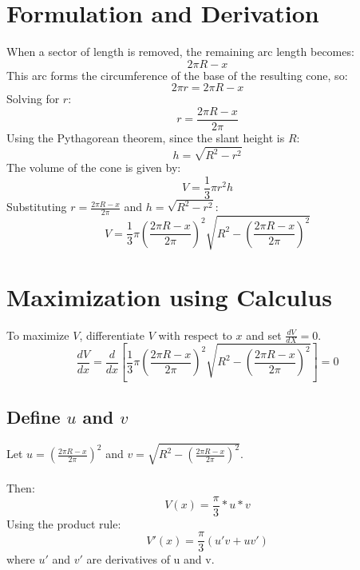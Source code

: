 \documentclass{article}
\begin{document}
\section{Formulation and Derivation}
When a sector of length is removed, the remaining arc length becomes:
\begin{equation}
    2\pi R - x
\end{equation}
This arc forms the circumference of the base of the resulting cone, so:
\begin{equation}
    2\pi r = 2\pi R - x
\end{equation}
Solving for \( r \):
\begin{equation}
    r = \frac{2\pi R - x}{2\pi}
\end{equation}
Using the Pythagorean theorem, since the slant height is \( R \):
\begin{equation}
    h = \sqrt{R^2 - r^2}
\end{equation}
The volume of the cone is given by:
\begin{equation}
    V = \frac{1}{3} \pi r^2 h
\end{equation}
Substituting \(r = \frac{2\pi R - x}{2\pi} \) and \(h = \sqrt{R^2 - r^2} \):
\begin{equation}
    V = \frac{1}{3} \pi \left(\frac{2\pi R - x}{2\pi}\right)^2 \sqrt{R^2 - \left(\frac{2\pi R - x}{2\pi}\right)^2}
\end{equation}


\section{Maximization using Calculus}
To maximize \( V \), differentiate \( V \) with respect to \( x \) and set \( \frac{dV}{dX} = 0 \).
\begin{equation}
    \frac{dV}{dx} = \frac{d}{dx} \left[\frac{1}{3} \pi \left(\frac{2\pi R - x}{2\pi}\right)^2 \sqrt{R^2 - \left(\frac{2\pi R - x}{2\pi}\right)^2} \right] = 0
\end{equation}
\subsection{Define \( u \) and \( v \)}
Let \( u = \left(\frac{2\pi R - x}{2\pi}\right)^2 \) and \( v = \sqrt{R^2 - \left(\frac{2\pi R - x}{2\pi}\right)^2} \). \\ \\
\noindent Then: 
\begin{equation}
    V(x) = \frac{\pi}{3} * u * v
\end{equation}
Using the product rule:
\begin{equation}
    V'(x) = \frac{\pi}{3}\left(u'v+uv'\right)
\end{equation}
where \( u' \) and \( v' \) are derivatives of u and v.
\end{document}
